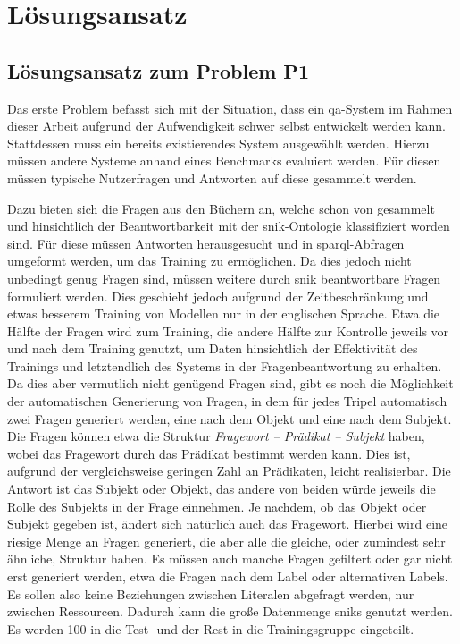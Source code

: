 \chapter{Lösungsansatz}\label{ch:approach}

\section{Lösungsansatz zum Problem P1}

Das erste Problem befasst sich mit der Situation, dass ein \ac{qa}-System im Rahmen dieser Arbeit aufgrund der Aufwendigkeit schwer selbst entwickelt werden kann.
Stattdessen muss ein bereits existierendes System ausgewählt werden.
Hierzu müssen andere Systeme anhand eines Benchmarks evaluiert werden.
Für diesen müssen typische Nutzerfragen und Antworten auf diese gesammelt werden.

Dazu bieten sich die Fragen aus den Büchern an, welche schon von \citet{arneba} gesammelt und hinsichtlich der Beantwortbarkeit mit der \ac{snik}-Ontologie klassifiziert worden sind.
Für diese müssen Antworten herausgesucht und in \ac{sparql}-Abfragen umgeformt werden, um das Training zu ermöglichen.
Da dies jedoch nicht unbedingt genug Fragen sind, müssen weitere durch \ac{snik} beantwortbare Fragen formuliert werden.
Dies geschieht jedoch aufgrund der Zeitbeschränkung und etwas besserem Training von Modellen nur in der englischen Sprache.
Etwa die Hälfte der Fragen wird zum Training, die andere Hälfte zur Kontrolle jeweils vor und nach dem Training genutzt,
um Daten hinsichtlich der Effektivität des Trainings und letztendlich des Systems in der Fragenbeantwortung zu erhalten.
Da dies aber vermutlich nicht genügend Fragen sind, gibt es noch die Möglichkeit der automatischen Generierung von Fragen, in dem für jedes Tripel automatisch zwei Fragen generiert werden,
eine nach dem Objekt und eine nach dem Subjekt.
Die Fragen können etwa die Struktur \emph{Fragewort -- Prädikat -- Subjekt} haben, wobei das Fragewort durch das Prädikat bestimmt werden kann.
Dies ist, aufgrund der vergleichsweise geringen Zahl an Prädikaten, leicht realisierbar.
Die Antwort ist das Subjekt oder Objekt, das andere von beiden würde jeweils die Rolle des Subjekts in der Frage einnehmen.
Je nachdem, ob das Objekt oder Subjekt gegeben ist, ändert sich natürlich auch das Fragewort.
Hierbei wird eine riesige Menge an Fragen generiert, die aber alle die gleiche, oder zumindest sehr ähnliche, Struktur haben.
Es müssen auch manche Fragen gefiltert oder gar nicht erst generiert werden, etwa die Fragen nach dem Label oder alternativen Labels.
Es sollen also keine Beziehungen zwischen Literalen abgefragt werden, nur zwischen Ressourcen.
Dadurch kann die große Datenmenge \ac{snik}s genutzt werden.
Es werden 100 in die Test- und der Rest in die Trainingsgruppe eingeteilt.

